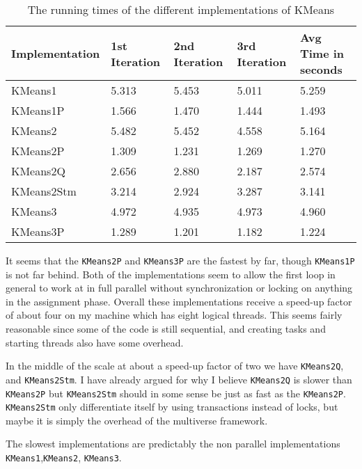 \begin{table}[H]
\centering
\begin{tabular}{|l|l|l|l|l|}
\hline
\rowcolor{Gray}
Implementation & 1st Iteration & 2nd Iteration & 3rd Iteration & Avg Time in seconds
 \\ \hline
KMeans1        & 5.313         & 5.453         & 5.011         & 5.259
               \\ \hline
KMeans1P       & 1.566         & 1.470         & 1.444         & 1.493
               \\ \hline
KMeans2        & 5.482         & 5.452         & 4.558         & 5.164
               \\ \hline
KMeans2P       & 1.309         & 1.231         & 1.269         & 1.270
               \\ \hline
KMeans2Q       & 2.656         & 2.880         & 2.187         & 2.574
               \\ \hline
KMeans2Stm     & 3.214         & 2.924         & 3.287         & 3.141
               \\ \hline
KMeans3        & 4.972         & 4.935         & 4.973         & 4.960
               \\ \hline
KMeans3P       & 1.289         & 1.201         & 1.182         & 1.224
               \\ \hline
\end{tabular}
\caption{The running times of the different implementations of KMeans}
\label{tabel:4:8}
\end{table}

It seems that the \texttt{KMeans2P} and \texttt{KMeans3P} are the fastest by far, though \texttt{KMeans1P} is not far behind. Both of the implementations seem to allow the first loop in general to work at in full parallel without synchronization or locking on anything in the assignment phase. Overall these implementations receive a speed-up factor of about four on my machine which has eight logical threads. This seems fairly reasonable since some of the code is still sequential, and creating tasks and starting threads also have some overhead.

In the middle of the scale at about a speed-up factor of two we have \texttt{KMeans2Q}, and \texttt{KMeans2Stm}. I have already argued for why I believe \texttt{KMeans2Q} is slower than \texttt{KMeans2P} but \texttt{KMeans2Stm} should in some sense be just as fast as the \texttt{KMeans2P}. \texttt{KMeans2Stm} only differentiate itself by using transactions instead of locks, but maybe it is simply the overhead of the multiverse framework.

The slowest implementations are predictably the non parallel implementations \texttt{KMeans1},\texttt{KMeans2}, \texttt{KMeans3}.

